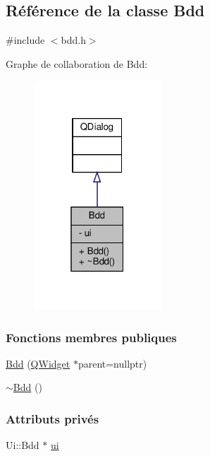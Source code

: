 \hypertarget{class_bdd}{}\subsection{Référence de la classe Bdd}
\label{class_bdd}


{\ttfamily \#include $<$bdd.\+h$>$}



Graphe de collaboration de Bdd\+:
\nopagebreak
\begin{figure}[H]
\begin{center}
\leavevmode
\includegraphics[width=135pt]{class_bdd__coll__graph}
\end{center}
\end{figure}
\subsubsection*{Fonctions membres publiques}
\begin{DoxyCompactItemize}
\item 
\hyperlink{class_bdd_a9b439e0eaab93fcea818892e1daf809b}{Bdd} (\hyperlink{class_q_widget}{Q\+Widget} $\ast$parent=nullptr)
\item 
\hyperlink{class_bdd_a5029277f27f8cfcf9d8603fb331a15dd}{$\sim$\+Bdd} ()
\end{DoxyCompactItemize}
\subsubsection*{Attributs privés}
\begin{DoxyCompactItemize}
\item 
Ui\+::\+Bdd $\ast$ \hyperlink{class_bdd_a7d9f43a44caaddb2f5ccd728ecc78c2a}{ui}
\end{DoxyCompactItemize}


